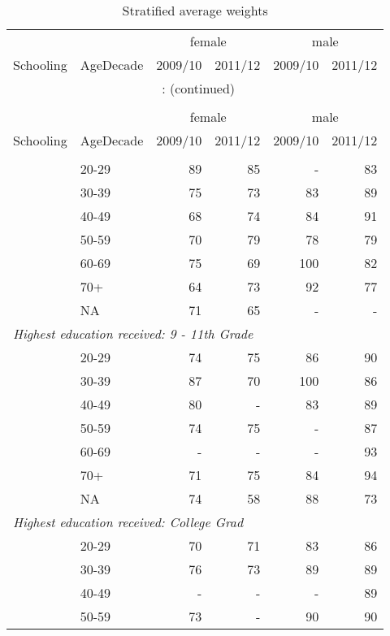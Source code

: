 \documentclass{article}
\begin{document}
\hypertarget{Stratified average weights}{} 
\begingroup\footnotesize\begin{longtable}{llrrrr}
\caption{Stratified average weights}\\
\toprule
&&
\multicolumn{2}{c}{female}&\multicolumn{2}{c}{male} \\
\cmidrule(lr){3-4} \cmidrule(lr){5-6}
Schooling & AgeDecade & 2009/10 & 2011/12 & 2009/10 & 2011/12 \\
\hline
\endfirsthead
\multicolumn{6}{c}{\tablename~\thetable{}: (continued)}\\\\
\toprule
&&
\multicolumn{2}{c}{female}&\multicolumn{2}{c}{male} \\
\cmidrule(lr){3-4} \cmidrule(lr){5-6}
Schooling & AgeDecade & 2009/10 & 2011/12 & 2009/10 & 2011/12 \\
\hline
\endhead \hline \endfoot \hline
\endlastfoot
\multicolumn{ 5 }{l}{\textit{ Highest education received: 8th Grade }}\\
&  20-29 & 89 & 85 & - & 83 \\
 &  30-39 & 75 & 73 & 83 & 89 \\
 &  40-49 & 68 & 74 & 84 & 91 \\
 &  50-59 & 70 & 79 & 78 & 79 \\
 &  60-69 & 75 & 69 & 100 & 82 \\
 &  70+ & 64 & 73 & 92 & 77 \\
 & NA & 71 & 65 & - & - \\
\multicolumn{ 5 }{l}{\textit{ Highest education received: 9 - 11th Grade }}\\
&  20-29 & 74 & 75 & 86 & 90 \\
 &  30-39 & 87 & 70 & 100 & 86 \\
 &  40-49 & 80 & - & 83 & 89 \\
 &  50-59 & 74 & 75 & - & 87 \\
 &  60-69 & - & - & - & 93 \\
 &  70+ & 71 & 75 & 84 & 94 \\
 & NA & 74 & 58 & 88 & 73 \\
\multicolumn{ 5 }{l}{\textit{ Highest education received: College Grad }}\\
&  20-29 & 70 & 71 & 83 & 86 \\
 &  30-39 & 76 & 73 & 89 & 89 \\
 &  40-49 & - & - & - & 89 \\
 &  50-59 & 73 & - & 90 & 90 \\

\end{longtable}
\end{document}
